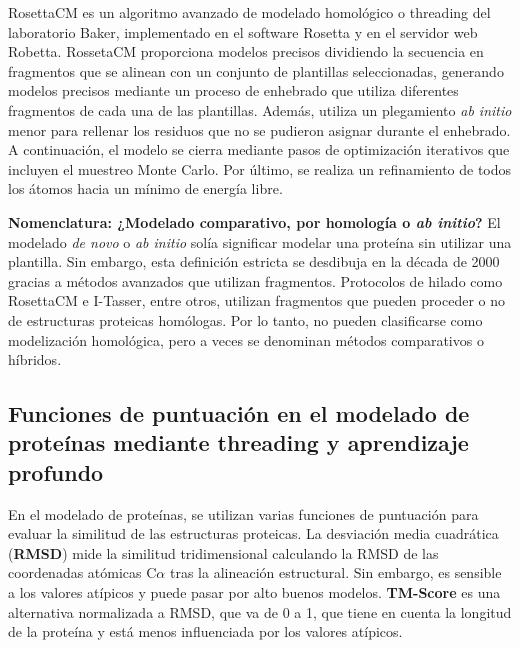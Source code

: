 RosettaCM es un algoritmo avanzado de modelado homológico o threading del laboratorio Baker, implementado en el software Rosetta y en el servidor web Robetta. RossetaCM proporciona modelos precisos dividiendo la secuencia en fragmentos que se alinean con un conjunto de plantillas seleccionadas, generando modelos precisos mediante un proceso de enhebrado que utiliza diferentes fragmentos de cada una de las plantillas. Además, utiliza un plegamiento \textit{ab initio} menor para rellenar los residuos que no se pudieron asignar durante el enhebrado. A continuación, el modelo se cierra mediante pasos de optimización iterativos que incluyen el muestreo Monte Carlo. Por último, se realiza un refinamiento de todos los átomos hacia un mínimo de energía libre.

\begin{table}[htbp]
\begin{mdframed}[backgroundcolor=black!10]
\centering
\textbf{Nomenclatura: ¿Modelado comparativo, por homología o \textit{ab initio}?} 
El modelado \textit{de novo} o \textit{ab initio} solía significar modelar una proteína sin utilizar una plantilla. Sin embargo, esta definición estricta se desdibuja en la década de 2000 gracias a métodos avanzados que utilizan fragmentos. Protocolos de hilado como RosettaCM e I-Tasser, entre otros, utilizan fragmentos que pueden proceder o no de estructuras proteicas homólogas. Por lo tanto, no pueden clasificarse como modelización homológica, pero a veces se denominan métodos comparativos o híbridos.
\end{mdframed}
\end{table}

\subsection{Funciones de puntuación en el modelado de proteínas mediante threading y aprendizaje profundo}
En el modelado de proteínas, se utilizan varias funciones de puntuación para evaluar la similitud de las estructuras proteicas. La desviación media cuadrática (\textbf{RMSD}) mide la similitud tridimensional calculando la RMSD de las coordenadas atómicas C$\alpha$ tras la alineación estructural. Sin embargo, es sensible a los valores atípicos y puede pasar por alto buenos modelos. \textbf{TM-Score} es una alternativa normalizada a RMSD, que va de 0 a 1, que tiene en cuenta la longitud de la proteína y está menos influenciada por los valores atípicos.

